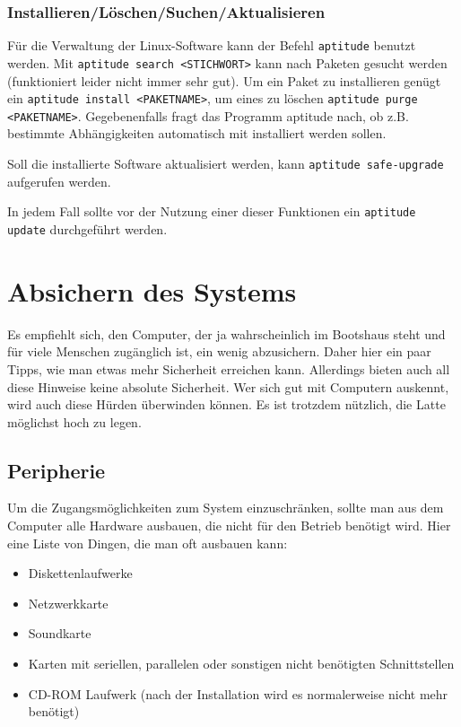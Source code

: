 \documentclass[a4paper,12pt,twoside]{article}
\begin{document}
\subsubsection{Installieren/Löschen/Suchen/Aktualisieren}
\label{sct:software_management}
Für die Verwaltung der
Linux-Software kann der Befehl \texttt{aptitude}
benutzt werden. Mit \texttt{aptitude search
{\textless}STICHWORT{\textgreater}} kann nach Paketen
gesucht werden (funktioniert leider nicht immer sehr gut). Um ein Paket
zu installieren genügt ein \texttt{aptitude install
{\textless}PAKETNAME{\textgreater}}, um eines zu löschen
\texttt{aptitude purge
{\textless}PAKETNAME{\textgreater}}. Gegebenenfalls fragt
das Programm aptitude nach, ob z.B. bestimmte Abhängigkeiten
automatisch mit installiert werden sollen.

Soll die installierte Software aktualisiert werden, kann
\texttt{aptitude safe-upgrade} aufgerufen werden.

In jedem Fall sollte vor der Nutzung einer dieser Funktionen ein
\texttt{aptitude update} durchgeführt werden.


\section{Absichern des Systems}
\label{sct:system_absichern}
Es empfiehlt sich, den Computer, der
ja wahrscheinlich im Bootshaus steht und für viele Menschen
zugänglich ist, ein wenig abzusichern. Daher hier ein paar Tipps, wie
man etwas mehr Sicherheit erreichen kann. Allerdings bieten auch all
diese Hinweise keine absolute Sicherheit. Wer sich gut mit Computern
auskennt, wird auch diese Hürden überwinden können. Es ist trotzdem
nützlich, die Latte möglichst hoch zu legen.


\subsection{Peripherie}
\label{sct:peripherie}
Um die Zugangsmöglichkeiten zum System
einzuschränken, sollte man aus dem Computer alle Hardware ausbauen, die
nicht für den Betrieb benötigt wird. Hier eine Liste von Dingen, die
man oft ausbauen kann:

\begin{itemize}
    \item Diskettenlaufwerke
    \item Netzwerkkarte
    \item Soundkarte
    \item Karten mit seriellen, parallelen oder sonstigen nicht benötigten
        Schnittstellen
    \item CD-ROM Laufwerk (nach der Installation wird es normalerweise nicht
        mehr benötigt)
\end{itemize}
\end{document}
